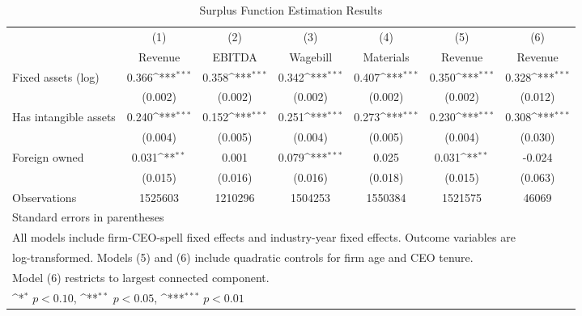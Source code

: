\begin{table}[htbp]\centering
\def\sym#1{\ifmmode^{#1}\else\(^{#1}\)\fi}
\caption{Surplus Function Estimation Results}
\begin{tabular}{l*{6}{c}}
\toprule
                    &\multicolumn{1}{c}{(1)}&\multicolumn{1}{c}{(2)}&\multicolumn{1}{c}{(3)}&\multicolumn{1}{c}{(4)}&\multicolumn{1}{c}{(5)}&\multicolumn{1}{c}{(6)}\\
                    &\multicolumn{1}{c}{Revenue}&\multicolumn{1}{c}{EBITDA}&\multicolumn{1}{c}{Wagebill}&\multicolumn{1}{c}{Materials}&\multicolumn{1}{c}{Revenue}&\multicolumn{1}{c}{Revenue}\\
\midrule
Fixed assets (log)  &       0.366\sym{***}&       0.358\sym{***}&       0.342\sym{***}&       0.407\sym{***}&       0.350\sym{***}&       0.328\sym{***}\\
                    &     (0.002)         &     (0.002)         &     (0.002)         &     (0.002)         &     (0.002)         &     (0.012)         \\
\addlinespace
Has intangible assets&       0.240\sym{***}&       0.152\sym{***}&       0.251\sym{***}&       0.273\sym{***}&       0.230\sym{***}&       0.308\sym{***}\\
                    &     (0.004)         &     (0.005)         &     (0.004)         &     (0.005)         &     (0.004)         &     (0.030)         \\
\addlinespace
Foreign owned       &       0.031\sym{**} &       0.001         &       0.079\sym{***}&       0.025         &       0.031\sym{**} &      -0.024         \\
                    &     (0.015)         &     (0.016)         &     (0.016)         &     (0.018)         &     (0.015)         &     (0.063)         \\
\midrule
Observations        &     1525603         &     1210296         &     1504253         &     1550384         &     1521575         &       46069         \\
\bottomrule
\multicolumn{7}{l}{\footnotesize Standard errors in parentheses}\\
\multicolumn{7}{l}{\footnotesize All models include firm-CEO-spell fixed effects and industry-year fixed effects. Outcome variables are}\\
\multicolumn{7}{l}{\footnotesize log-transformed. Models (5) and (6) include quadratic controls for firm age and CEO tenure.}\\
\multicolumn{7}{l}{\footnotesize Model (6) restricts to largest connected component.}\\
\multicolumn{7}{l}{\footnotesize \sym{*} \(p<0.10\), \sym{**} \(p<0.05\), \sym{***} \(p<0.01\)}\\
\end{tabular}
\end{table}
